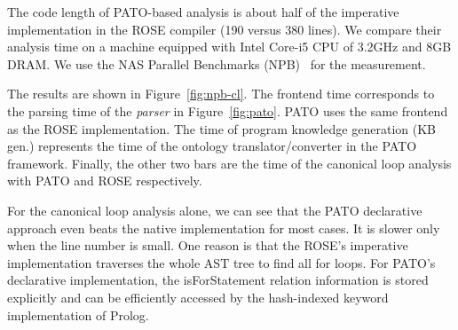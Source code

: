 The code length of PATO-based analysis is about half of the imperative
implementation in the ROSE compiler (190 versus 380 lines).  We
compare their analysis time on a machine equipped with Intel Core-i5
CPU of 3.2GHz and 8GB DRAM. We use the NAS Parallel Benchmarks
(NPB)~\cite{Bailey91thenas} for the measurement.

The results are shown in Figure~\ref{fig:npb-cl}.  The frontend time
corresponds to the parsing time of the \emph{parser} in
Figure~\ref{fig:pato}.  PATO uses the same frontend as the ROSE
implementation.  The time of program knowledge generation (KB gen.)
represents the time of the ontology translator/converter in the PATO
framework.
Finally, the other two bars are the time of the canonical loop
analysis with PATO and ROSE respectively.

For the canonical loop analysis alone, we can see that the PATO
declarative approach even beats the native implementation for most
cases.  It is slower only when the line number is small.  One reason
is that the ROSE's imperative implementation traverses
the whole AST tree to find all for loops.
For PATO's declarative implementation, the \textsf{isForStatement}
relation information is stored explicitly and can be efficiently
accessed by the hash-indexed keyword implementation of Prolog.

